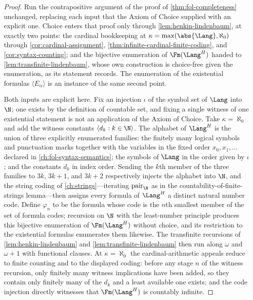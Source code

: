 \begin{proof}
Run the contrapositive argument of the proof of
\cref{thm:fol-completeness} unchanged, replacing each
input that the Axiom of Choice supplied with an explicit one.  Choice
enters that proof only through \cref{lem:henkin-lindenbaum}, at exactly
two points: the cardinal bookkeeping at
\(\kappa=\max(\abs{\Lang},\aleph_0)\) through
\cref{cor:cardinal-assignment}, \cref{thm:infinite-cardinal-finite-coding},
and \cref{cor:syntax-counting}; and the bijective enumeration of
\(\Fm(\Lang^H)\) handed to \cref{lem:transfinite-lindenbaum}, whose own
construction is choice-free given the enumeration, as its statement
records.  The enumeration of the existential formulas
\(\langle E_\alpha\rangle\) is an instance of the same second point.

Both inputs are explicit here.  Fix an injection \(\iota\) of the symbol
set of \(\Lang\) into \(\N\); one exists by the definition of countable
set, and fixing a single witness of one existential statement is not an
application of the Axiom of Choice.  Take \(\kappa=\aleph_0\) and add the
witness constants \(\langle d_k:k\in\N\rangle\).  The alphabet of
\(\Lang^H\) is the union of three explicitly enumerated families: the
finitely many logical symbols and punctuation marks together with the
variables in the fixed order \(x_0,x_1,\ldots\) declared in
\cref{ch:fol-syntax-semantics}; the symbols of \(\Lang\) in the order
given by \(\iota\); and the constants \(d_k\) in index order.  Sending
the \(k\)th member of the three families to \(3k\), \(3k+1\), and
\(3k+2\) respectively injects the alphabet into \(\N\), and the string
coding of \cref{ch:strings}---iterating \(\operatorname{pair}_{\N}\) as
in the countability-of-finite-strings lemma---then assigns every formula
of \(\Lang^H\) a distinct natural number code.  Define \(\varphi_n\) to
be the formula whose code is the \(n\)th smallest member of the set of
formula codes; recursion on \(\N\) with the least-number principle
produces this bijective enumeration of \(\Fm(\Lang^H)\) without choice,
and its restriction to the existential formulas enumerates them likewise.
The transfinite recursions of \cref{lem:henkin-lindenbaum} and
\cref{lem:transfinite-lindenbaum} then run along \(\omega\) and
\(\omega+1\) with functional clauses.  At \(\kappa=\aleph_0\) the
cardinal-arithmetic appeals reduce to finite counting and to the displayed
coding: before any stage \(n\) of the witness recursion, only finitely
many witness implications have been added, so they contain only finitely
many of the \(d_k\) and a least available one exists; and the code
injection directly witnesses that \(\Fm(\Lang^H)\) is countably
infinite.


\end{proof}
